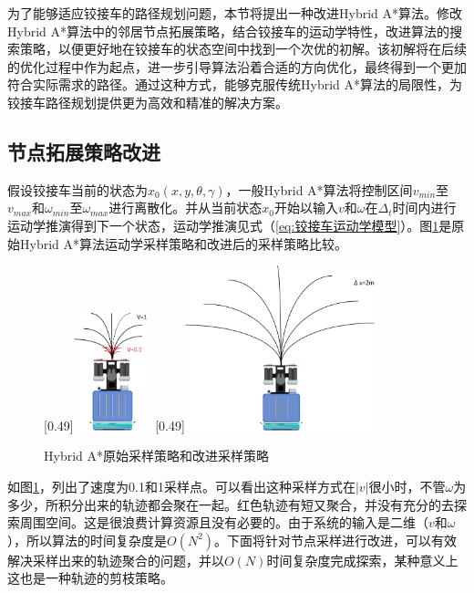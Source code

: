 \documentclass[master,academic]{ysuthesis} %
\begin{document}
	为了能够适应铰接车的路径规划问题，本节将提出一种改进Hybrid A*算法。修改Hybrid A*算法中的邻居节点拓展策略，结合铰接车的运动学特性，改进算法的搜索策略，以便更好地在铰接车的状态空间中找到一个次优的初解。该初解将在后续的优化过程中作为起点，进一步引导算法沿着合适的方向优化，最终得到一个更加符合实际需求的路径。通过这种方式，能够克服传统Hybrid A*算法的局限性，为铰接车路径规划提供更为高效和精准的解决方案。
		\subsection{节点拓展策略改进}
		假设铰接车当前的状态为$x_0(x,y,\theta,\gamma)$，一般Hybrid A*算法将控制区间$v_{min}$至$v_{max}$和$\omega_{min}$至$\omega_{max}$进行离散化。并从当前状态$x_0$开始以输入$v$和$\omega$在$\Delta_t$时间内进行运动学推演得到下一个状态，运动学推演见式（\ref{eq:铰接车运动学模型}）。图\ref{fig:Hybrid A*原始采样策略和改进采样策略}是原始Hybrid A*算法运动学采样策略和改进后的采样策略比较。 
		\begin{figure}[H]
			\centering
			[0.49\textwidth]{\includegraphics[width=0.2\textwidth]{hybrid采样.png}}
			[0.49\textwidth]{\includegraphics[width=0.5\textwidth]{hybrid采样改进剪枝.png}}
			\caption{Hybrid A*原始采样策略和改进采样策略}
			\label{fig:Hybrid A*原始采样策略和改进采样策略}
		\end{figure}
		如图\ref{fig:Hybrid A*原始采样策略和改进采样策略}，列出了速度为0.1和1采样点。可以看出这种采样方式在$|v|$很小时，不管$\omega$为多少，所积分出来的轨迹都会聚在一起。红色轨迹有短又聚合，并没有充分的去探索周围空间。这是很浪费计算资源且没有必要的。由于系统的输入是二维（$v$和$\omega$），所以算法的时间复杂度是$O(N^2)$。下面将针对节点采样进行改进，可以有效解决采样出来的轨迹聚合的问题，并以$O(N)$时间复杂度完成探索，某种意义上这也是一种轨迹的剪枝策略。 
\end{document}
